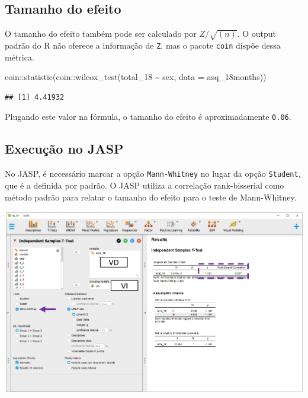 \documentclass[
]{book}
\newenvironment{Shaded}{\begin{snugshade}}{\end{snugshade}}
\newcommand{\AttributeTok}[1]{\textcolor[rgb]{0.77,0.63,0.00}{#1}}
\newcommand{\FunctionTok}[1]{\textcolor[rgb]{0.00,0.00,0.00}{#1}}
\newcommand{\NormalTok}[1]{#1}
\newcommand{\SpecialCharTok}[1]{\textcolor[rgb]{0.00,0.00,0.00}{#1}}
\begin{document}
\hypertarget{tamanho-do-efeito-2}{%
\subsection{Tamanho do efeito}\label{tamanho-do-efeito-2}}

O tamanho do efeito também pode ser calculado por \(Z/\sqrt{(n)}\). O output padrão do R não oferece a informação de \texttt{Z}, mas o pacote \texttt{coin} dispõe dessa métrica.

\begin{Shaded}
\begin{Highlighting}[]
\NormalTok{coin}\SpecialCharTok{::}\FunctionTok{statistic}\NormalTok{(coin}\SpecialCharTok{::}\FunctionTok{wilcox\_test}\NormalTok{(total\_18 }\SpecialCharTok{\textasciitilde{}}\NormalTok{ sex, }
                                  \AttributeTok{data =}\NormalTok{ asq\_18months))}
\end{Highlighting}
\end{Shaded}

\begin{verbatim}
## [1] 4.41932
\end{verbatim}

Plugando este valor na fórmula, o tamanho do efeito é aproximadamente \texttt{0.06}.

\hypertarget{execuuxe7uxe3o-no-jasp-5}{%
\subsection{Execução no JASP}\label{execuuxe7uxe3o-no-jasp-5}}

No JASP, é necessário marcar a opção \texttt{Mann-Whitney} no lugar da opção \texttt{Student}, que é a definida por padrão. O JASP utiliza a correlação rank-bisserial como método padrão para relatar o tamanho do efeito para o teste de Mann-Whitney.

\includegraphics{./img/cap_testet_mw.png}
\end{document}
